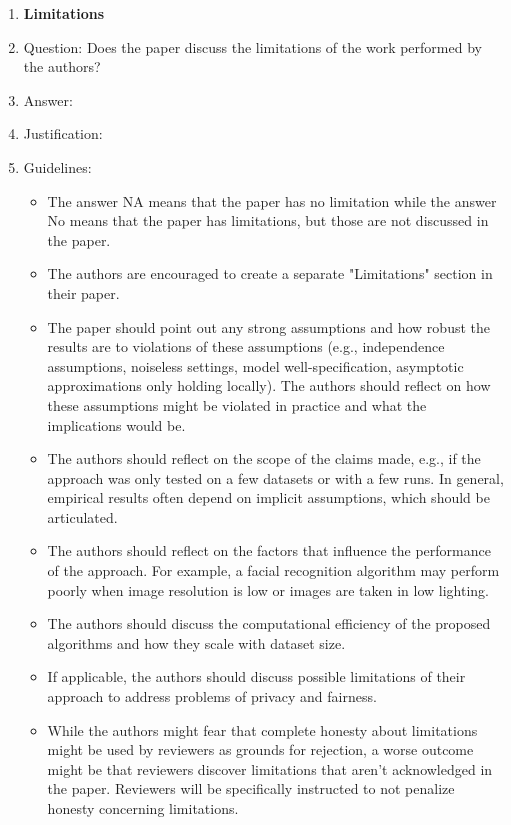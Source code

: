 \documentclass{article}
\begin{document}
\begin{enumerate}
\item {\bf Limitations}
    \item[] Question: Does the paper discuss the limitations of the work performed by the authors?
    \item[] Answer: \answerTODO{} %
    \item[] Justification: \justificationTODO{}
    \item[] Guidelines:
    \begin{itemize}
        \item The answer NA means that the paper has no limitation while the answer No means that the paper has limitations, but those are not discussed in the paper. 
        \item The authors are encouraged to create a separate "Limitations" section in their paper.
        \item The paper should point out any strong assumptions and how robust the results are to violations of these assumptions (e.g., independence assumptions, noiseless settings, model well-specification, asymptotic approximations only holding locally). The authors should reflect on how these assumptions might be violated in practice and what the implications would be.
        \item The authors should reflect on the scope of the claims made, e.g., if the approach was only tested on a few datasets or with a few runs. In general, empirical results often depend on implicit assumptions, which should be articulated.
        \item The authors should reflect on the factors that influence the performance of the approach. For example, a facial recognition algorithm may perform poorly when image resolution is low or images are taken in low lighting. 
        \item The authors should discuss the computational efficiency of the proposed algorithms and how they scale with dataset size.
        \item If applicable, the authors should discuss possible limitations of their approach to address problems of privacy and fairness.
        \item While the authors might fear that complete honesty about limitations might be used by reviewers as grounds for rejection, a worse outcome might be that reviewers discover limitations that aren't acknowledged in the paper. Reviewers will be specifically instructed to not penalize honesty concerning limitations.
    \end{itemize}


\end{enumerate}
\end{document}
